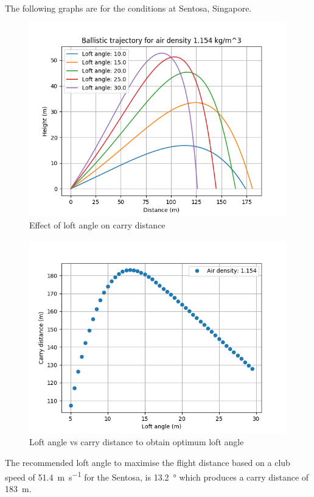 \documentclass[12pt]{article}
\begin{document}
 The following graphs are for the conditions at Sentosa, Singapore.

\begin{figure}[H]
\centering
\caption{Effect of loft angle on carry distance}
\includegraphics[scale=0.6]{results1154}
\end{figure}

\begin{figure}[H]
\centering
\caption{Loft angle vs carry distance to obtain optimum loft angle}
\includegraphics[scale=0.6]{results1154range}
\end{figure}

The recommended loft angle to maximise the flight distance based on a club speed of \SI{51.4}{\metre\per\second} for the Sentosa, is \SI{13.2}{\degree} which produces a carry distance of \SI{183}{\metre}.
 
\end{document}
